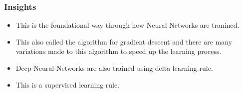 \documentclass[../main.tex]{subfiles}
\begin{document}
\subsubsection{Insights}
\begin{itemize}
\item This is the foundational way through how Neural Networks are tranined.
\item This also called the algorithm for gradient descent and there are many variations made to this algorithm to speed up the learning process.
\item Deep Neural Networks are also trained using delta learning rule.
\item This is a supervised learning rule.
\end{itemize}
\end{document}
